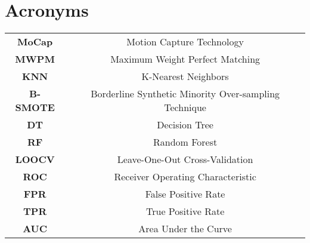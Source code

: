 \section*{\Huge Acronyms}



\begin{table}[H]
    \begin{tabular}{c c}
        \textbf{MoCap} & Motion Capture Technology \\
        \textbf{MWPM} & Maximum Weight Perfect Matching \\
        \textbf{KNN} & K-Nearest Neighbors \\
        \textbf{B-SMOTE} & Borderline Synthetic Minority Over-sampling Technique \\
        \textbf{DT} & Decision Tree \\
        \textbf{RF} & Random Forest \\
        \textbf{LOOCV} & Leave-One-Out Cross-Validation \\
        \textbf{ROC} & Receiver Operating Characteristic \\
        \textbf{FPR} & False Positive Rate \\
        \textbf{TPR} & True Positive Rate \\
        \textbf{AUC} & Area Under the Curve \\
    \end{tabular}
\end{table}

